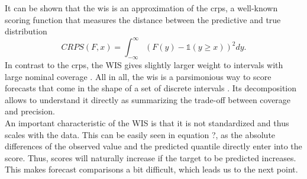 It can be shown that the \ac{wis} is an approximation of the \ac{crps}, a well-known scoring function that measures the distance between the predictive and true distribution 
\begin{equation}
CRPS(F, x) = \int_{-\infty}^{\infty} \left(F(y) - \mathbb{1}(y \geq x) \right)^2dy.
\end{equation}
In contrast to the \ac{crps}, the WIS gives slightly larger weight to intervals with large nominal coverage \citep{bracher_evaluating_2021}.
All in all, the \ac{wis} is a parsimonious way to score forecasts that come in the shape of a set of discrete intervals \citep{sherratt_predictive_2022}. Its decomposition allows to understand it directly as summarizing the trade-off between coverage and precision. \\
An important characteristic of the WIS is that it is not standardized and thus scales with the data. This can be easily seen in equation ?, as the absolute differences of the observed value and the predicted quantile directly enter into the score. Thus, scores will naturally increase if the target to be predicted increases. This makes forecast comparisons a bit difficult, which leads us to the next point.
